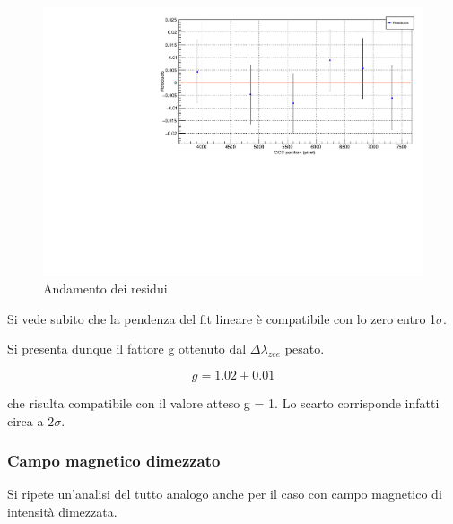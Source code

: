 \documentclass{article}
\begin{document}
	\begin{center}
		\begin{figure}[H]
			\centering
			\includegraphics[scale=0.38, angle=0]{campomax/g_residuals.pdf}
			\setlength{\belowcaptionskip}{-20pt}
			\caption{Andamento dei residui}
			\label{fig:g_res}
		\end{figure}
	\end{center}

	Si vede subito che la pendenza del fit lineare è compatibile con lo zero entro 1$\sigma$. 
	
	Si presenta dunque il fattore g ottenuto dal $\Delta\lambda_{zee}$ pesato.

	\[
		g = 1.02 \pm 0.01
	\]
	
	che risulta compatibile con il valore atteso g = 1.
	Lo scarto corrisponde infatti circa a 2$\sigma$.  

	 
	\subsubsection*{Campo magnetico dimezzato}

	Si ripete un'analisi del tutto analogo anche per il caso con campo magnetico di intensità dimezzata.
	
\end{document}
